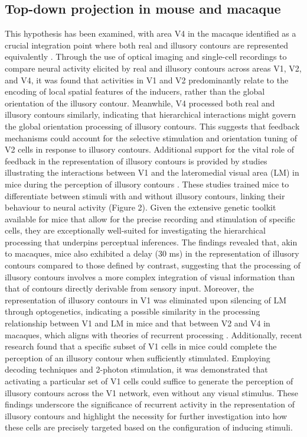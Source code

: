 \documentclass[12pt]{article}
\begin{document}
\subsection{Top-down projection in mouse and macaque}
This hypothesis has been examined, with area V4 in the macaque identified as a crucial integration point where both real and illusory contours are represented equivalently \autocite{panEquivalentRepresentationReal2012}. Through the use of optical imaging and single-cell recordings to compare neural activity elicited by real and illusory contours across areas V1, V2, and V4, it was found that activities in V1 and V2 predominantly relate to the encoding of local spatial features of the inducers, rather than the global orientation of the illusory contour. Meanwhile, V4 processed both real and illusory contours similarly, indicating that hierarchical interactions might govern the global orientation processing of illusory contours. This suggests that feedback mechanisms could account for the selective stimulation and orientation tuning of V2 cells in response to illusory contours. Additional support for the vital role of feedback in the representation of illusory contours is provided by studies illustrating the interactions between V1 and the lateromedial visual area (LM) in mice during the perception of illusory contours \autocite{pakTopDownFeedbackControls2020}. These studies trained mice to differentiate between stimuli with and without illusory contours, linking their behaviour to neural activity (Figure 2). Given the extensive genetic toolkit available for mice that allow for the precise recording and stimulation of specific cells, they are exceptionally well-suited for investigating the hierarchical processing that underpins perceptual inferences. The findings revealed that, akin to macaques, mice also exhibited a delay (30 ms) in the representation of illusory contours compared to those defined by contrast, suggesting that the processing of illusory contours involves a more complex integration of visual information than that of contours directly derivable from sensory input. Moreover, the representation of illusory contours in V1 was eliminated upon silencing of LM through optogenetics, indicating a possible similarity in the processing relationship between V1 and LM in mice and that between V2 and V4 in macaques, which aligns with theories of recurrent processing \autocite{wyatteEarlyRecurrentFeedback2014}. Additionally, recent research \cite{shinRecurrentPatternCompletion2023} found that a specific subset of V1 cells in mice could complete the perception of an illusory contour when sufficiently stimulated. Employing decoding techniques and 2-photon stimulation, it was demonstrated that activating a particular set of V1 cells could suffice to generate the perception of illusory contours across the V1 network, even without any visual stimulus. These findings underscore the significance of recurrent activity in the representation of illusory contours and highlight the necessity for further investigation into how these cells are precisely targeted based on the configuration of inducing stimuli. 
\end{document}
